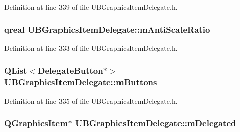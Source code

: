 Definition at line 339 of file U\-B\-Graphics\-Item\-Delegate.\-h.

\hypertarget{class_u_b_graphics_item_delegate_a02b5c8199e11b87de2303aa4a5ed09ac}{
\subsubsection[{m\-Anti\-Scale\-Ratio}]{\setlength{\rightskip}{0pt plus 5cm}qreal U\-B\-Graphics\-Item\-Delegate\-::m\-Anti\-Scale\-Ratio\hspace{0.3cm}{\ttfamily [protected]}}}\label{dd/dd5/class_u_b_graphics_item_delegate_a02b5c8199e11b87de2303aa4a5ed09ac}


Definition at line 333 of file U\-B\-Graphics\-Item\-Delegate.\-h.

\hypertarget{class_u_b_graphics_item_delegate_abd27d9387610bf45761035ee4ae6ff37}{
\subsubsection[{m\-Buttons}]{\setlength{\rightskip}{0pt plus 5cm}Q\-List$<${\bf Delegate\-Button}$\ast$$>$ U\-B\-Graphics\-Item\-Delegate\-::m\-Buttons\hspace{0.3cm}{\ttfamily [protected]}}}\label{dd/dd5/class_u_b_graphics_item_delegate_abd27d9387610bf45761035ee4ae6ff37}


Definition at line 335 of file U\-B\-Graphics\-Item\-Delegate.\-h.

\hypertarget{class_u_b_graphics_item_delegate_a126d39dd710594d5f4f1c9956c0aafe3}{
\subsubsection[{m\-Delegated}]{\setlength{\rightskip}{0pt plus 5cm}Q\-Graphics\-Item$\ast$ U\-B\-Graphics\-Item\-Delegate\-::m\-Delegated\hspace{0.3cm}{\ttfamily [protected]}}}\label{dd/dd5/class_u_b_graphics_item_delegate_a126d39dd710594d5f4f1c9956c0aafe3}


